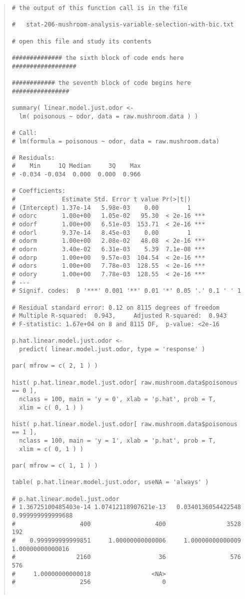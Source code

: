 \documentclass[12pt]{article}
\begin{document}
\begin{quote}
\begin{verbatim}
# the output of this function call is in the file

#   stat-206-mushroom-analysis-variable-selection-with-bic.txt

# open this file and study its contents

############## the sixth block of code ends here ##################

############ the seventh block of code begins here ################

summary( linear.model.just.odor <- 
  lm( poisonous ~ odor, data = raw.mushroom.data ) )

# Call:
# lm(formula = poisonous ~ odor, data = raw.mushroom.data)

# Residuals:
#    Min     1Q Median     3Q    Max 
# -0.034 -0.034  0.000  0.000  0.966 

# Coefficients:
#             Estimate Std. Error t value Pr(>|t|)    
# (Intercept) 1.37e-14   5.98e-03    0.00        1    
# odorc       1.00e+00   1.05e-02   95.30  < 2e-16 ***
# odorf       1.00e+00   6.51e-03  153.71  < 2e-16 ***
# odorl       9.37e-14   8.45e-03    0.00        1    
# odorm       1.00e+00   2.08e-02   48.08  < 2e-16 ***
# odorn       3.40e-02   6.31e-03    5.39  7.1e-08 ***
# odorp       1.00e+00   9.57e-03  104.54  < 2e-16 ***
# odors       1.00e+00   7.78e-03  128.55  < 2e-16 ***
# odory       1.00e+00   7.78e-03  128.55  < 2e-16 ***
# ---
# Signif. codes:  0 '***' 0.001 '**' 0.01 '*' 0.05 '.' 0.1 ' ' 1

# Residual standard error: 0.12 on 8115 degrees of freedom
# Multiple R-squared:  0.943,     Adjusted R-squared:  0.943 
# F-statistic: 1.67e+04 on 8 and 8115 DF,  p-value: <2e-16

p.hat.linear.model.just.odor <- 
  predict( linear.model.just.odor, type = 'response' )

par( mfrow = c( 2, 1 ) )

hist( p.hat.linear.model.just.odor[ raw.mushroom.data$poisonous == 0 ],
  nclass = 100, main = 'y = 0', xlab = 'p.hat', prob = T,
  xlim = c( 0, 1 ) )

hist( p.hat.linear.model.just.odor[ raw.mushroom.data$poisonous == 1 ],
  nclass = 100, main = 'y = 1', xlab = 'p.hat', prob = T,
  xlim = c( 0, 1 ) )

par( mfrow = c( 1, 1 ) )

table( p.hat.linear.model.just.odor, useNA = 'always' )

# p.hat.linear.model.just.odor
# 1.36725100485403e-14 1.07412118907621e-13   0.0340136054422548    0.999999999999688 
#                  400                  400                 3528                  192 
#    0.999999999999851     1.00000000000006     1.00000000000009     1.00000000000016 
#                 2160                   36                  576                  576 
#     1.00000000000018                 <NA> 
#                  256                    0 


\end{verbatim}
\end{quote}
\end{document}
